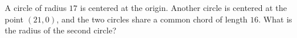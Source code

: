 A circle of radius $17$ is centered at the origin. Another circle is centered at the point $(21, 0)$, and the two circles share a common chord of length $16$. What is the radius of the second circle?
